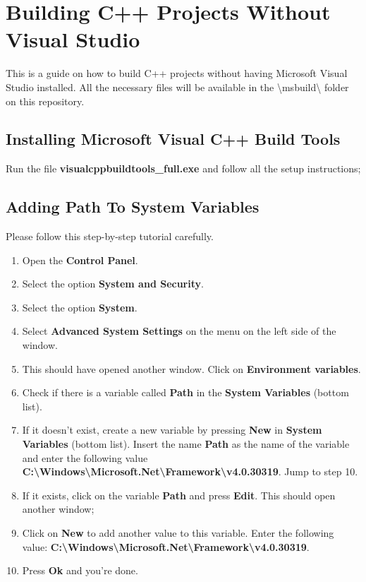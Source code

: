 \chapter{Building C++ Projects Without Visual Studio}

This is a guide on how to build C++ projects without having Microsoft Visual Studio installed.
All the necessary files will be available in the \textbackslash{}msbuild\textbackslash{} folder on this repository.


\section{Installing Microsoft Visual C++ Build Tools}
  Run the file \textbf{visualcppbuildtools\_full.exe} and follow all the setup instructions;
\section{Adding Path To System Variables}
  Please follow this step-by-step tutorial carefully.
  \begin{enumerate}
    \item Open the \textbf{Control Panel}.
    \item Select the option \textbf{System and Security}.
    \item Select the option \textbf{System}.
    \item Select \textbf{Advanced System Settings} on the menu on the left side of the window.
    \item This should have opened another window. Click on \textbf{Environment variables}.
    \item Check if there is a variable called \textbf{Path} in the \textbf{System Variables} (bottom list).
    \item If it doesn't exist, create a new variable by pressing \textbf{New} in \textbf{System Variables} (bottom list). Insert the name \textbf{Path} as the name of the variable and enter the following value \textbf{C:\textbackslash{}Windows\textbackslash{}Microsoft.Net\textbackslash{}Framework\textbackslash{}v4.0.30319}. Jump to step 10.
    \item If it exists, click on the variable \textbf{Path} and press \textbf{Edit}. This should open another window;
    \item Click on \textbf{New} to add another value to this variable. Enter the following value: \textbf{C:\textbackslash{}Windows\textbackslash{}Microsoft.Net\textbackslash{}Framework\textbackslash{}v4.0.30319}.
    \item Press \textbf{Ok} and you're done.
  \end{enumerate}
\pagebreak
